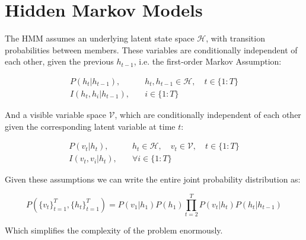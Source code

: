 \documentclass[bsc,singlespacing,logo, parskip, deptreport]{infthesis}
\begin{document}
\begin{center}
\end{center}

\section{Hidden Markov Models}

The HMM assumes an underlying latent state space $\mathcal H$, with transition probabilities between members. These variables are conditionally independent of each other, given the previous $h_{t-1}$, i.e. the first-order Markov Assumption:

\begin{align}
  P(h_t | h_{t-1}),& \quad h_t, h_{t-1} \in {\mathcal H}, \quad  t \in \{1:T\} \\
  I(h_t, h_i | h_{t-1}),&  \quad i \in \{1:T\}
\end{align}

And a visible variable space $\mathcal V$, which are conditionally independent of each other given the corresponding latent variable at time $t$:

\begin{align}
  P(v_t | h_t),& \quad h_t \in {\mathcal H}, \quad v_t \in {\mathcal V}, \quad  t \in \{1:T\} \\
  I(v_t, v_i | h_{t}),& \quad \forall i \in \{1:T\}
\end{align}

Given these assumptions we can write the entire joint probability distribution as:

\begin{equation}
  P(\{v_{t}\}^{T}_{t=1}, \{h_{t}\}^{T}_{t=1}) = P(v_1 | h_1) P(h_1) \prod_{t=2}^{T} P(v_t | h_t) P(h_t | h_{t-1})
\end{equation}

Which simplifies the complexity of the problem enormously.
\end{document}
